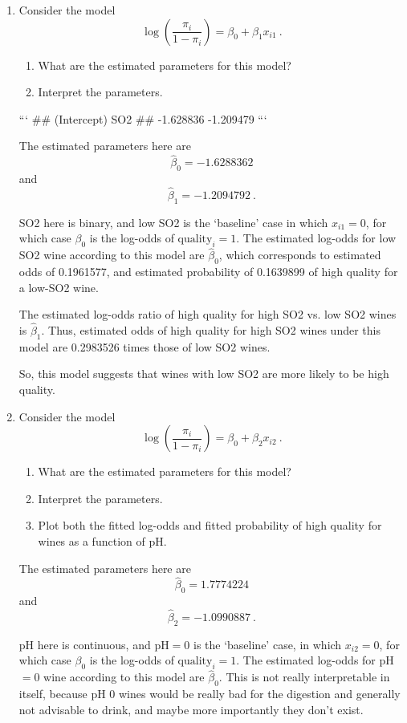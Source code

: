 \documentclass[
]{article}
\begin{document}
\begin{enumerate}
\item Consider the model \[\log\left(\frac{\pi_i}{1-\pi_i}\right)= \beta_0 + \beta_1 x_{i1}\ .\]
\begin{enumerate}
\item What are the estimated parameters for this model?
\item Interpret the parameters.
\end{enumerate}


```
## (Intercept)         SO2 
##   -1.628836   -1.209479
```

The estimated parameters here are \[\hat\beta_0 = -1.6288362\] and \[\hat\beta_1 = -1.2094792\ .\]

SO2 here is binary, and low SO2 is the `baseline' case in which $x_{i1}=0$, for which case $\beta_0$ is the log-odds of $\text{quality}_i = 1$. The estimated log-odds for low SO2 wine according to this model are $\hat\beta_0$, which corresponds to estimated odds of 0.1961577, and estimated probability of 0.1639899 of high quality for a low-SO2 wine.

The estimated log-odds ratio of high quality for high SO2 vs. low SO2 wines is $\hat\beta_1$. Thus, estimated odds of high quality for high SO2 wines under this model are 0.2983526 times those of low SO2 wines.

So, this model suggests that wines with low SO2 are more likely to be high quality.

\item Consider the model \[\log\left(\frac{\pi_i}{1-\pi_i}\right)= \beta_0 + \beta_2 x_{i2}\ .\]
\begin{enumerate}
\item What are the estimated parameters for this model?
\item Interpret the parameters.
\item Plot both the fitted log-odds and fitted probability of high quality for wines as a function of pH.
\end{enumerate}



The estimated parameters here are \[\hat\beta_0 = 1.7774224\] and \[\hat\beta_2 = -1.0990887\ .\]

pH here is continuous, and pH$=0$ is the `baseline' case, in which $x_{i2}=0$, for which case $\beta_0$ is the log-odds of $\text{quality}_i = 1$. The estimated log-odds for pH$=0$ wine according to this model are $\hat\beta_0$. This is not really interpretable in itself, because pH 0 wines would be really bad for the digestion and generally not advisable to drink, and maybe more importantly they don't exist.


\end{enumerate}
\end{document}
